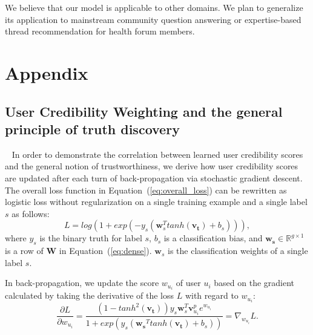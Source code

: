 \documentclass{bmcart}
\begin{document}
We believe that our model is applicable to other domains. We plan to generalize its application to mainstream community question answering or expertise-based thread recommendation for health forum members.


\newpage
\section*{Appendix}
\subsection{User Credibility Weighting and the general principle of truth discovery}~\label{appendix:math}
In order to demonstrate the correlation between learned user credibility scores and the general notion of trustworthiness, we derive how user credibility scores are updated after each turn of back-propagation via stochastic gradient descent.
The overall loss function in Equation~(\ref{eq:overall_loss}) can be rewritten as logistic loss without regularization on a single training example and a single label $s$ as follows: 
\begin{equation}
    L = log(1+exp(-y_s(\boldsymbol{w}_{s}^T tanh(\boldsymbol{v_t})+b_s))), 
\end{equation}
where $y_s$ is the binary truth for label $s$, $b_s$ is a classification bias, and $\boldsymbol{w_s}\in \mathbb{R}^{g\times1}$ is a row of $\boldsymbol{W}$ in Equation~(\ref{eq:dense}). $\boldsymbol{w}_{s}$ is the classification weights of a single label $s$.

In back-propagation, we update the score $w_{u_i}$ of user $u_i$ based on the gradient calculated by taking the derivative of the loss $L$ 
with regard to $w_{u_i}$:
\begin{equation}
    \frac{\partial L}{\partial w_{u_i}} = \frac{(1-tanh^2(\boldsymbol{v_t})){y_s}\boldsymbol{w}_{s}^T \boldsymbol{v}^{p}_{u_i}e^{w_{u_i}}}{1+exp(y_s(\boldsymbol{w_s}^T tanh(\boldsymbol{v_t})+b_s))}=\nabla_{w_{u_i}}L.
\end{equation}
\end{document}
